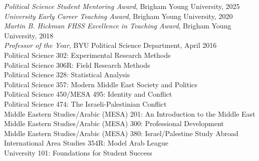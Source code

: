 \documentclass[10pt]{article}
\begin{document}
\raggedright
\textit{Political Science Student Mentoring Award}, Brigham Young University, 2025\\[5pt]
\textit{University Early Career Teaching Award}, Brigham Young University, 2020\\[5pt]
\textit{Martin B. Hickman FHSS Excellence in Teaching Award}, Brigham Young University, 2018\\[5pt]
\textit{Professor of the Year}, BYU Political Science Department, April 2016\\[5pt]
Political Science 302: Experimental Research Methods\\[5pt]
Political Science 306R: Field Research Methods\\[5pt]
Political Science 328: Statistical Analysis\\[5pt]
Political Science 357: Modern Middle East Society and Politics\\[5pt]
Political Science 450/MESA 495: Identity and Conflict\\[5pt]
Political Science 474: The Israeli-Palestinian Conflict\\[5pt]
Middle Eastern Studies/Arabic (MESA) 201: An Introduction to the Middle East\\[5pt]
Middle Eastern Studies/Arabic (MESA) 300: Professional Development\\[5pt]
Middle Eastern Studies/Arabic (MESA) 380: Israel/Palestine Study Abroad\\[5pt]
International Area Studies 354R: Model Arab League\\[5pt]
University 101: Foundations for Student Success%



 









	
\end{document}
